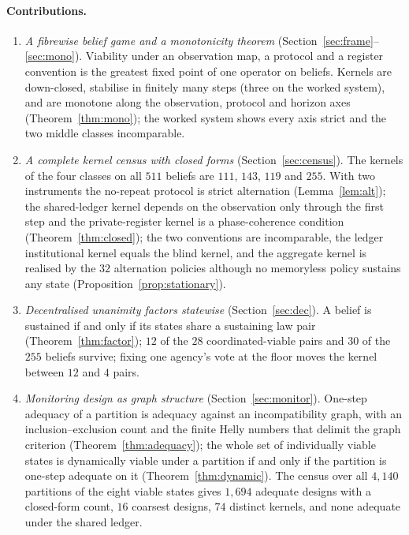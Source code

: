 \paragraph{Contributions.}
\begin{enumerate}[leftmargin=2em,itemsep=1pt]
\item \emph{A fibrewise belief game and a monotonicity theorem} (Section~\ref{sec:frame}--\ref{sec:mono}). Viability under an observation map, a protocol and a register convention is the greatest fixed point of one operator on beliefs. Kernels are down-closed, stabilise in finitely many steps (three on the worked system), and are monotone along the observation, protocol and horizon axes (Theorem~\ref{thm:mono}); the worked system shows every axis strict and the two middle classes incomparable.
\item \emph{A complete kernel census with closed forms} (Section~\ref{sec:census}). The kernels of the four classes on all $511$ beliefs are $111$, $143$, $119$ and $255$. With two instruments the no-repeat protocol is strict alternation (Lemma~\ref{lem:alt}); the shared-ledger kernel depends on the observation only through the first step and the private-register kernel is a phase-coherence condition (Theorem~\ref{thm:closed}); the two conventions are incomparable, the ledger institutional kernel equals the blind kernel, and the aggregate kernel is realised by the $32$ alternation policies although no memoryless policy sustains any state (Proposition~\ref{prop:stationary}).
\item \emph{Decentralised unanimity factors statewise} (Section~\ref{sec:dec}). A belief is sustained if and only if its states share a sustaining law pair (Theorem~\ref{thm:factor}); $12$ of the $28$ coordinated-viable pairs and $30$ of the $255$ beliefs survive; fixing one agency's vote at the floor moves the kernel between $12$ and $4$ pairs.
\item \emph{Monitoring design as graph structure} (Section~\ref{sec:monitor}). One-step adequacy of a partition is adequacy against an incompatibility graph, with an inclusion--exclusion count and the finite Helly numbers that delimit the graph criterion (Theorem~\ref{thm:adequacy}); the whole set of individually viable states is dynamically viable under a partition if and only if the partition is one-step adequate on it (Theorem~\ref{thm:dynamic}). The census over all $4{,}140$ partitions of the eight viable states gives $1{,}694$ adequate designs with a closed-form count, $16$ coarsest designs, $74$ distinct kernels, and none adequate under the shared ledger.

\end{enumerate}
